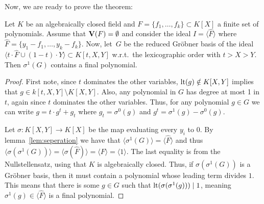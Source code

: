 Now, we are ready to prove the theorem:

\begin{theorem}
  Let $K$ be an algebraically closed field and $F = \{f_{1}, \dots, f_{k}\} \subset K[X]$ a finite set of polynomials. Assume that $\operatorname{\mathbf V}(F) = \emptyset$ and consider the ideal $I = \langle \hat F \rangle$ where $\hat F = \{y_{1} - f_{1}, \dots, y_{k} - f_{k}\}$. Now, let $\,G$ be the reduced Gröbner basis of the ideal $\langle t \cdot \hat F \cup (1 - t) \cdot Y \rangle \subset K[t, X, Y]$ w.r.t.\ the lexicographic order with $t > X > Y$. Then
  $\sigma^{1}(G)$ contains a final polynomial.
\end{theorem}
\begin{proof}
  First note, since $t$ dominates the other variables, $\operatorname{lt}(g) \notin K[X, Y]$ implies that $g \in k[t, X, Y] \setminus K[X, Y]$. Also, any polynomial in $G$ has degree at most 1 in $t$, again since $t$ dominates the other variables. Thus, for any polynomial $g \in G$ we can write $g = t\cdot g^{t} + g_{t}$ where $g_{t} = \sigma^{0}(g)$ and $g^{t} = \sigma^{1}(g) - \sigma^{0}(g)$.

  Let $\sigma : K[X, Y] \to K[X]$ be the map evaluating every $y_{i}$ to 0. By lemma~\ref{lem:seperation} we have that $\langle \sigma^{1}(G) \rangle = \langle \hat F \rangle$ and thus $\langle \sigma(\sigma^{1}(G)) \rangle = \langle \sigma(\hat F) \rangle = \langle F \rangle = \langle 1 \rangle$. The last equality is from the Nullstellensatz, using that $K$ is algebraically closed. Thus, if $\sigma(\sigma^{1}(G))$ is a Gröbner basis, then it must contain a polynomial whose leading term divides $1$. This means that there is some $g \in G$ such that $\operatorname{lt}(\sigma(\sigma^{1}(g))) \mid 1$, meaning $\sigma^{1}(g) \in \langle \hat F \rangle$ is a final polynomial.


\end{proof}
